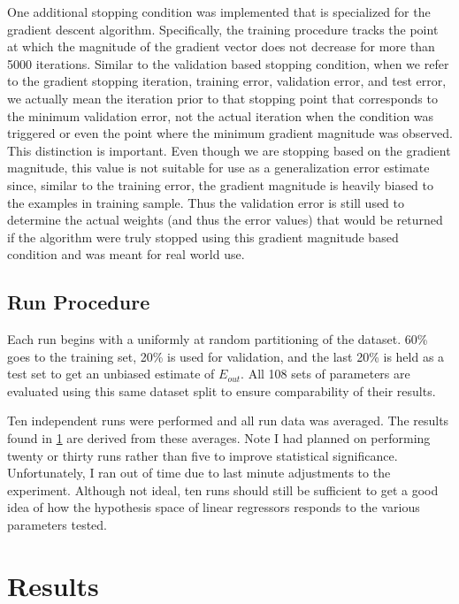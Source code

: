 \documentclass[runningheads]{llncs}
\begin{document}
One additional stopping condition was implemented that is specialized for the gradient descent algorithm. Specifically, the training procedure tracks the point at which the magnitude of the gradient vector does not decrease for more than 5000 iterations. Similar to the validation based stopping condition, when we refer to the gradient stopping iteration, training error, validation error, and test error, we actually mean the iteration prior to that stopping point that corresponds to the minimum validation error, not the actual iteration when the condition was triggered or even the point where the minimum gradient magnitude was observed. This distinction is important. Even though we are stopping based on the gradient magnitude, this value is not suitable for use as a generalization error estimate since, similar to the training error, the gradient magnitude is heavily biased to the examples in training sample. Thus the validation error is still used to determine the actual weights (and thus the error values) that would be returned if the algorithm were truly stopped using this gradient magnitude based condition and was meant for real world use.

\subsection{Run Procedure}

Each run begins with a uniformly at random partitioning of the dataset. 60\% goes to the training set, 20\% is used for validation, and the last 20\% is held as a test set to get an unbiased estimate of $E_{out}$. All 108 sets of parameters are evaluated using this same dataset split to ensure comparability of their results.

Ten independent runs were performed and all run data was averaged. The results found in \ref{sec:results} are derived from these averages. Note I had planned on performing twenty or thirty runs rather than five to improve statistical significance. Unfortunately, I ran out of time due to last minute adjustments to the experiment. Although not ideal, ten runs should still be sufficient to get a good idea of how the hypothesis space of linear regressors responds to the various parameters tested.  



\section{Results}
\label{sec:results}
\end{document}
